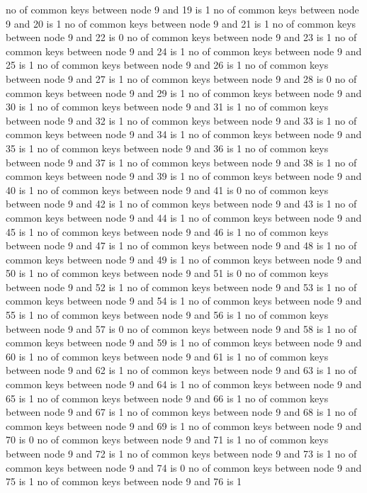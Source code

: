 no of common keys between node 9 and 19 is 1
no of common keys between node 9 and 20 is 1
no of common keys between node 9 and 21 is 1
no of common keys between node 9 and 22 is 0
no of common keys between node 9 and 23 is 1
no of common keys between node 9 and 24 is 1
no of common keys between node 9 and 25 is 1
no of common keys between node 9 and 26 is 1
no of common keys between node 9 and 27 is 1
no of common keys between node 9 and 28 is 0
no of common keys between node 9 and 29 is 1
no of common keys between node 9 and 30 is 1
no of common keys between node 9 and 31 is 1
no of common keys between node 9 and 32 is 1
no of common keys between node 9 and 33 is 1
no of common keys between node 9 and 34 is 1
no of common keys between node 9 and 35 is 1
no of common keys between node 9 and 36 is 1
no of common keys between node 9 and 37 is 1
no of common keys between node 9 and 38 is 1
no of common keys between node 9 and 39 is 1
no of common keys between node 9 and 40 is 1
no of common keys between node 9 and 41 is 0
no of common keys between node 9 and 42 is 1
no of common keys between node 9 and 43 is 1
no of common keys between node 9 and 44 is 1
no of common keys between node 9 and 45 is 1
no of common keys between node 9 and 46 is 1
no of common keys between node 9 and 47 is 1
no of common keys between node 9 and 48 is 1
no of common keys between node 9 and 49 is 1
no of common keys between node 9 and 50 is 1
no of common keys between node 9 and 51 is 0
no of common keys between node 9 and 52 is 1
no of common keys between node 9 and 53 is 1
no of common keys between node 9 and 54 is 1
no of common keys between node 9 and 55 is 1
no of common keys between node 9 and 56 is 1
no of common keys between node 9 and 57 is 0
no of common keys between node 9 and 58 is 1
no of common keys between node 9 and 59 is 1
no of common keys between node 9 and 60 is 1
no of common keys between node 9 and 61 is 1
no of common keys between node 9 and 62 is 1
no of common keys between node 9 and 63 is 1
no of common keys between node 9 and 64 is 1
no of common keys between node 9 and 65 is 1
no of common keys between node 9 and 66 is 1
no of common keys between node 9 and 67 is 1
no of common keys between node 9 and 68 is 1
no of common keys between node 9 and 69 is 1
no of common keys between node 9 and 70 is 0
no of common keys between node 9 and 71 is 1
no of common keys between node 9 and 72 is 1
no of common keys between node 9 and 73 is 1
no of common keys between node 9 and 74 is 0
no of common keys between node 9 and 75 is 1
no of common keys between node 9 and 76 is 1
